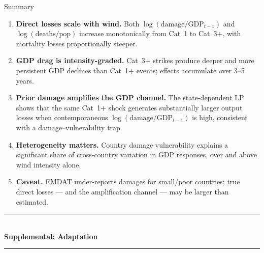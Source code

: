 \documentclass[aspectratio=169,c]{beamer}
\begin{document}
\begin{frame}{Summary}
\begin{enumerate}
  \item \textbf{Direct losses scale with wind.}  Both $\log(\text{damage}/\text{GDP}_{t-1})$
        and $\log(\text{deaths/pop})$ increase monotonically from Cat~1 to
        Cat~3$+$, with mortality losses proportionally steeper.

  \medskip
  \item \textbf{GDP drag is intensity-graded.}  Cat~3$+$ strikes produce
        deeper and more persistent GDP declines than Cat~1$+$ events;
        effects accumulate over 3--5 years.

  \medskip
  \item \textbf{Prior damage amplifies the GDP channel.}
        The state-dependent LP shows that the same Cat~1$+$ shock
        generates substantially larger output losses when contemporaneous
        $\log(\text{damage}/\text{GDP}_{t-1})$ is high, consistent with a
        damage--vulnerability trap.

  \medskip
  \item \textbf{Heterogeneity matters.}
        Country damage vulnerability explains a significant share of
        cross-country variation in GDP responses, over and above
        wind intensity alone.

  \medskip
  \item \textbf{Caveat.}
        EMDAT under-reports damages for small/poor countries;
        true direct losses --- and the amplification channel ---
        may be larger than estimated.
\end{enumerate}
\end{frame}

\appendix

\begin{frame}
\centering
\vfill
{\color{primary!40}\rule{0.35\textwidth}{0.4pt}}\\[1.2em]
{\LARGE\bfseries\color{primary}Supplemental: Adaptation}\\[1.2em]
{\color{primary!40}\rule{0.35\textwidth}{0.4pt}}
\vfill
\end{frame}
\end{document}
